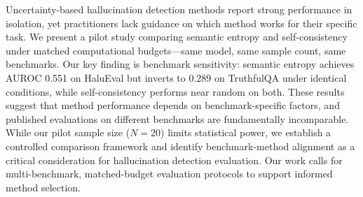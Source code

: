 Uncertainty-based hallucination detection methods report strong performance in isolation, yet practitioners lack guidance on which method works for their specific task. We present a pilot study comparing semantic entropy and self-consistency under matched computational budgets---same model, same sample count, same benchmarks. Our key finding is benchmark sensitivity: semantic entropy achieves AUROC 0.551 on HaluEval but inverts to 0.289 on TruthfulQA under identical conditions, while self-consistency performs near random on both. These results suggest that method performance depends on benchmark-specific factors, and published evaluations on different benchmarks are fundamentally incomparable. While our pilot sample size ($N=20$) limits statistical power, we establish a controlled comparison framework and identify benchmark-method alignment as a critical consideration for hallucination detection evaluation. Our work calls for multi-benchmark, matched-budget evaluation protocols to support informed method selection.
